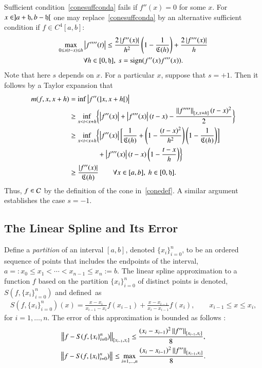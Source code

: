 \documentclass[review]{elsarticle}
\newcommand{\datasites}{\{x_i\}_{i=0}^n}
\theoremstyle{definition}
\begin{document}
Sufficient condition~\eqref{conesuffconda} fails if $f''(x) = 0$ for some $x$.  For $x \in ]a + \fh, b-\fh[$ one may replace~\eqref{conesuffconda} by an alternative sufficient condition if  $f \in C^4[a,b]$:
\begin{multline} \label{conesuffcondb}
\max_{0 \le s(t-x) \le h }{\abs{f''''(t)}} \le \frac{2\abs{f''(x)}}{h^2} \left( 1 - \frac{1}{\fC(h)} \right) +  \frac{2\abs{f'''(x)}}{h}  \\ \forall  h \in [0,\fh], \ s = \sign(f''(x)f'''(x)).
\end{multline}
Note that here $s$ depends on $x$.  For a particular $x$, suppose that $s = +1$.  Then it follows by a Taylor expansion that
\begin{align*}
m(f,x,x+h) & = \inf \abs{f''(]x,x+h[)} \\
& \ge \inf_{x < t < x+h} \biggl\{ \abs{f''(x)} + \abs{f'''(x)}(t-x)  - \frac{\norm[{[x,x+h]}]{f''''}(t-x)^2}{2} \biggr\}\\
& \ge \inf_{x < t < x+h} \biggl\{ \abs{f''(x)} \biggl[ \frac{1}{\fC(h)} + \left(1 - \frac{(t-x)^2}{h^2}\right)\left(1 - \frac{1}{\fC(h)}\right) \biggr] \\
& \qquad \qquad + \abs{f'''(x)}(t-x)\left(1 -  \frac{t-x}{h}\right)  \biggr\}\\
& \ge  \frac{\abs{f''(x)}}{\fC(h)} \qquad \forall x \in [a,b],\ h \in [0,\fh].
\end{align*}
Thus, $f \in \cc$ by the definition of the cone in~\eqref{conedef}.  A similar argument establishes the case $s = -1$.

\subsection{The Linear Spline and Its Error} \label{subsec:spline}

Define a \emph{partition} of an interval $[a, b]$, denoted $\datasites$, to be
an ordered sequence of points that includes the endpoints of the interval,
$a=:x_0 \le x_1 < \cdots < x_{n-1} \le x_{n}:=b$.  The linear spline
approximation to a function $f$ based on the partition $\datasites$ of distinct points is denoted,
$S(f,\datasites)$ and defined~as
\begin{multline*} %
S(f,\datasites)(x) =  \frac{x-x_i}{x_{i-1} - x_i} f(x_{i-1}) + \frac{x-x_{i-1}}{x_{i} - x_{i-1}}f(x_i), 
\qquad x_{i-1} \le x \le x_i,
\end{multline*}
for $i=1, \ldots, n$.
The error of this approximation is bounded as follows \cite[Theorem 3.3]{BurFaiBur16a}:
\begin{subequations} \label{appxerrbda}
\begin{gather}
\label{appxerrbdapc}
\norm[{[x_{i-1},x_i]}]{f - S(f,\datasites)} \le \frac{(x_i - x_{i-1})^2\norm[{[x_{i-1},x_i]}]{f''}}{8}, \\
\norm{f - S(f,\datasites)} \le \max_{i=1, \ldots, n} \frac{(x_i - x_{i-1})^2\norm[{[x_{i-1},x_i]}]{f''}}{8}.
\end{gather}
\end{subequations}
\end{document}
